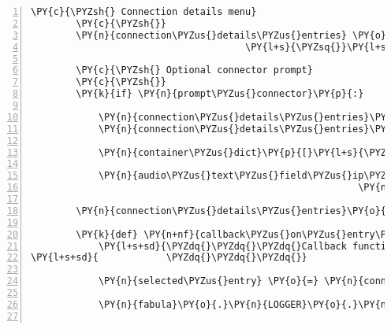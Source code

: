 \begin{Verbatim}[commandchars=\\\{\},numbers=left,firstnumber=1,stepnumber=1]
        \PY{c}{\PYZsh{} Connection details menu}
        \PY{c}{\PYZsh{}}
        \PY{n}{connection\PYZus{}details\PYZus{}entries} \PY{o}{=} \PY{p}{[}\PY{l+s}{\PYZsq{}}\PY{l+s}{Als Cassandra spielen}\PY{l+s}{\PYZsq{}}\PY{p}{,}
                                      \PY{l+s}{\PYZsq{}}\PY{l+s}{Als Kuni spielen}\PY{l+s}{\PYZsq{}}\PY{p}{]}

        \PY{c}{\PYZsh{} Optional connector prompt}
        \PY{c}{\PYZsh{}}
        \PY{k}{if} \PY{n}{prompt\PYZus{}connector}\PY{p}{:}

            \PY{n}{connection\PYZus{}details\PYZus{}entries}\PY{o}{.}\PY{n}{append}\PY{p}{(}\PY{l+s}{\PYZsq{}}\PY{l+s}{Ei Pi Adresse}\PY{l+s}{\PYZsq{}}\PY{p}{)}
            \PY{n}{connection\PYZus{}details\PYZus{}entries}\PY{o}{.}\PY{n}{append}\PY{p}{(}\PY{l+s}{\PYZsq{}}\PY{l+s}{Eine neue Ei Pi Adresse eingeben}\PY{l+s}{\PYZsq{}}\PY{p}{)}

            \PY{n}{container\PYZus{}dict}\PY{p}{[}\PY{l+s}{\PYZsq{}}\PY{l+s}{connector}\PY{l+s}{\PYZsq{}}\PY{p}{]} \PY{o}{=} \PY{l+s}{\PYZsq{}}\PY{l+s}{127.0.0.1}\PY{l+s}{\PYZsq{}}

            \PY{n}{audio\PYZus{}text\PYZus{}field\PYZus{}ip\PYZus{}address} \PY{o}{=} \PY{n}{AudioTextField}\PY{p}{(}\PY{l+s}{\PYZsq{}}\PY{l+s}{Ei Pi Adresse}\PY{l+s}{\PYZsq{}}\PY{p}{,}
                                                          \PY{n+nb+bp}{self}\PY{o}{.}\PY{n}{tts\PYZus{}engine}\PY{p}{)}

        \PY{n}{connection\PYZus{}details\PYZus{}entries}\PY{o}{.}\PY{n}{append}\PY{p}{(}\PY{l+s}{\PYZsq{}}\PY{l+s}{Beenden}\PY{l+s}{\PYZsq{}}\PY{p}{)}

        \PY{k}{def} \PY{n+nf}{callback\PYZus{}on\PYZus{}entry\PYZus{}selected}\PY{p}{(}\PY{n}{connection\PYZus{}details\PYZus{}menu}\PY{p}{)}\PY{p}{:}
            \PY{l+s+sd}{\PYZdq{}\PYZdq{}\PYZdq{}Callback function for entry selected in self.connection\PYZus{}details\PYZus{}menu.}
\PY{l+s+sd}{            \PYZdq{}\PYZdq{}\PYZdq{}}

            \PY{n}{selected\PYZus{}entry} \PY{o}{=} \PY{n}{connection\PYZus{}details\PYZus{}menu}\PY{o}{.}\PY{n}{list}\PY{p}{[}\PY{n}{connection\PYZus{}details\PYZus{}menu}\PY{o}{.}\PY{n}{list\PYZus{}index}\PY{p}{]}

            \PY{n}{fabula}\PY{o}{.}\PY{n}{LOGGER}\PY{o}{.}\PY{n}{debug}\PY{p}{(}\PY{l+s}{\PYZdq{}}\PY{l+s}{Entry selected: \PYZob{}\PYZcb{}}\PY{l+s}{\PYZdq{}}\PY{o}{.}\PY{n}{format}\PY{p}{(}\PY{n}{selected\PYZus{}entry}\PY{p}{)}\PY{p}{)}


\end{Verbatim}
